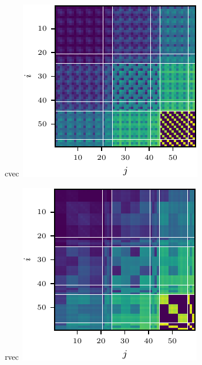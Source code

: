 \switchcolumn[1]
\begin{figure}
  \centering
  \begin{minipage}[t]{0.495\linewidth}
    \centering
    $\operatorname{cvec}$\vspace{1ex}
    \includegraphics[width=\linewidth]{../kfs/plots/synthetic_cvec_ggn.pdf}
  \end{minipage}
  \hfill
  \begin{minipage}[t]{0.495\linewidth}
    \centering
    $\operatorname{rvec}$\vspace{1ex}
    \includegraphics[width=\linewidth]{../kfs/plots/synthetic_rvec_ggn.pdf}

\end{minipage}
\end{figure}
